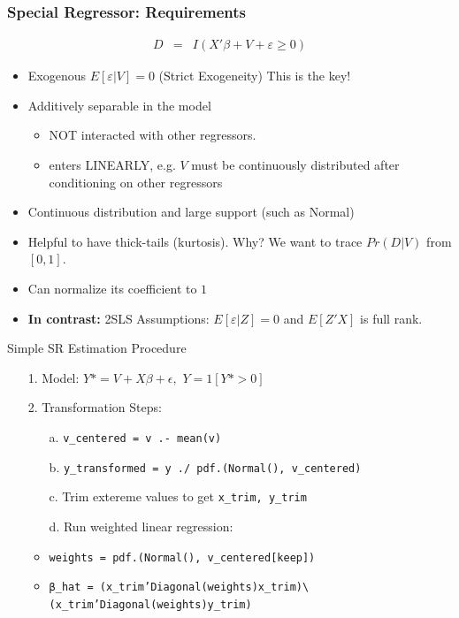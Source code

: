 \documentclass[11pt,dvipsnames,table,aspectratio=169]{beamer}
\begin{document}
\begin{frame}
\frametitle{Special Regressor: Requirements}
\begin{eqnarray*}
D &=& I ( X' \beta + V + \varepsilon \geq 0 )
\end{eqnarray*}
\vspace{-8pt}
\begin{itemize}
\item Exogenous $E[\varepsilon | V ] =0$ (Strict Exogeneity) \alert{This is the key!} 
\item Additively separable in the model
\begin{itemize}
       \item NOT interacted with other regressors.
       \item enters LINEARLY, e.g. $V$ must be continuously distributed after conditioning on other regressors 
\end{itemize}
\item Continuous distribution and large support (such as Normal)

\item Helpful to have thick-tails (kurtosis). Why? We want to trace $Pr(D | V)$ from $[0,1]$.
\item Can normalize its coefficient to $1$
\item \textbf{In contrast:} 2SLS Assumptions: $E[ \varepsilon | Z] = 0$ and $E[Z'X]$ is full rank.
\end{itemize}
\end{frame}


\begin{frame}{Simple SR Estimation Procedure}
\begin{itemize}
       \item[1.] Model: $Y*=V + X\beta + \epsilon, \,\,Y=1[Y*>0]$ 
       \item[2.] Transformation Steps:
       \begin{itemize}
       \item[a.] \texttt{v\_centered = v .- mean(v)}
       \item[b.] \texttt{y\_transformed = y ./ pdf.(Normal(), v\_centered)}
       \item[c.] Trim extereme values to get \texttt{x\_trim, y\_trim}
       \item[d.] Run weighted linear regression:\\
       \item \texttt{weights = pdf.(Normal(), v\_centered[keep])}
       \item \texttt{β\_hat = (x\_trim'Diagonal(weights)x\_trim)\textbackslash(x\_trim'Diagonal(weights)y\_trim)}
       \end{itemize} 
\end{itemize}
\end{frame}
\end{document}

